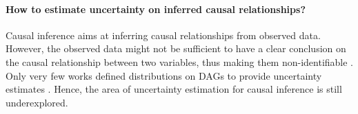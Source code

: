 \paragraph{How to estimate uncertainty on inferred causal relationships?} Causal inference aims at inferring causal relationships from observed data. However, the observed data might not be sufficient to have a clear conclusion on the causal relationship between two variables, thus making them non-identifiable \cite{pearl2009causality}. Only very few works defined distributions on DAGs to provide uncertainty estimates \cite{charpentier2022dpdag}. Hence, the area of uncertainty estimation for causal inference is still underexplored.
